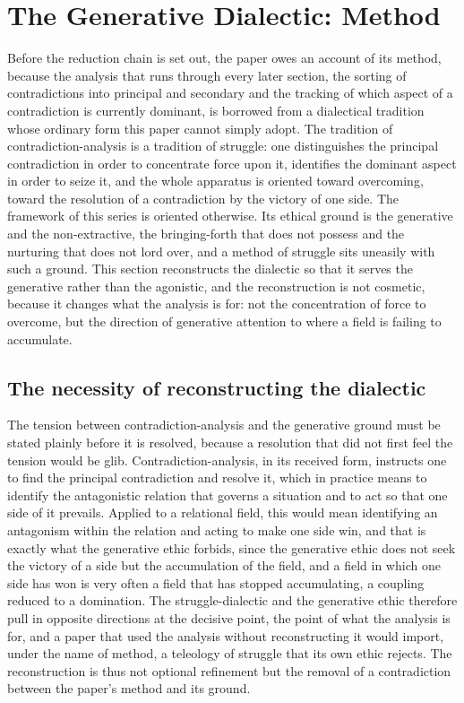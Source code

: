 \section{The Generative Dialectic: Method}
\label{p22:sec:method}

\noindent
Before the reduction chain is set out, the paper owes an account of its method, because the analysis that runs through every later section, the sorting of contradictions into principal and secondary and the tracking of which aspect of a contradiction is currently dominant, is borrowed from a dialectical tradition whose ordinary form this paper cannot simply adopt. The tradition of contradiction-analysis is a tradition of struggle: one distinguishes the principal contradiction in order to concentrate force upon it, identifies the dominant aspect in order to seize it, and the whole apparatus is oriented toward overcoming, toward the resolution of a contradiction by the victory of one side. The framework of this series is oriented otherwise. Its ethical ground is the generative and the non-extractive, the bringing-forth that does not possess and the nurturing that does not lord over, and a method of struggle sits uneasily with such a ground. This section reconstructs the dialectic so that it serves the generative rather than the agonistic, and the reconstruction is not cosmetic, because it changes what the analysis is for: not the concentration of force to overcome, but the direction of generative attention to where a field is failing to accumulate.

\subsection{The necessity of reconstructing the dialectic}
\label{p22:sub:method-why}

The tension between contradiction-analysis and the generative ground must be stated plainly before it is resolved, because a resolution that did not first feel the tension would be glib. Contradiction-analysis, in its received form, instructs one to find the principal contradiction and resolve it, which in practice means to identify the antagonistic relation that governs a situation and to act so that one side of it prevails. Applied to a relational field, this would mean identifying an antagonism within the relation and acting to make one side win, and that is exactly what the generative ethic forbids, since the generative ethic does not seek the victory of a side but the accumulation of the field, and a field in which one side has won is very often a field that has stopped accumulating, a coupling reduced to a domination. The struggle-dialectic and the generative ethic therefore pull in opposite directions at the decisive point, the point of what the analysis is for, and a paper that used the analysis without reconstructing it would import, under the name of method, a teleology of struggle that its own ethic rejects. The reconstruction is thus not optional refinement but the removal of a contradiction between the paper's method and its ground.


